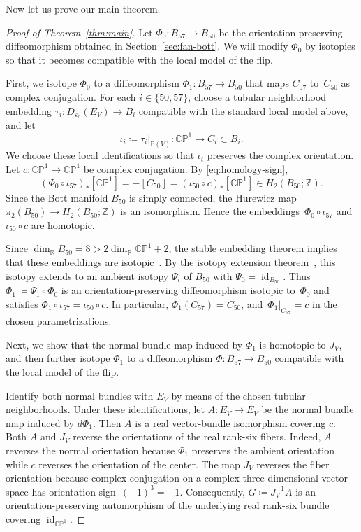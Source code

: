 \documentclass{amsart}
\numberwithin{equation}{section}
\theoremstyle{definition}
\newcommand{\Z}{\mathbb Z}
\newcommand{\R}{\mathbb R}
\renewcommand{\P}{\mathbb P}
\newcommand{\CP}{\mathbb{CP}}
\DeclareMathOperator{\id}{id}
\begin{document}
Now let us prove our main theorem.
\begin{proof}[Proof of Theorem~\ref{thm:main}]
    Let $\Phi_0\colon B_{57}\to B_{50}$ be the orientation-preserving diffeomorphism obtained in Section~\ref{sec:fan-bott}.
    We will modify $\Phi_0$ by isotopies so that it becomes compatible with the local model of the flip. 

    First, we isotope $\Phi_0$ to a diffeomorphism $\Phi_1\colon B_{57}\to B_{50}$ that maps $C_{57}$ to~$C_{50}$ as complex conjugation. 
    For each $i\in\{50,57\}$, choose a tubular neighborhood embedding $\tau_i\colon D_{\varepsilon_0}(E_V)\to B_i$ compatible with the standard local model above, and let
    $$
        \iota_i\coloneq \left.\tau_i\right|_{\P(V)} \colon \CP^1\longrightarrow C_i\subset B_i.
    $$
    We choose these local identifications so that $\iota_i$ preserves the complex orientation. 
    Let $c\colon\CP^1\to\CP^1$ be complex conjugation.
    By \eqref{eq:homology-sign},
    $$
        (\Phi_0\circ\iota_{57})_*[\CP^1] = -[C_{50}]= (\iota_{50}\circ c)_*[\CP^1] \in H_2(B_{50};\Z).
    $$
    Since the Bott manifold $B_{50}$ is simply connected, the Hurewicz map $\pi_2(B_{50})\to H_2(B_{50};\Z)$ is an isomorphism. 
    Hence the embeddings~$\Phi_0\circ\iota_{57}$ and $\iota_{50}\circ c$ are homotopic.
    
    Since $\dim_\R B_{50}=8>2\dim_\R \CP^1+2$, the stable embedding theorem implies that these embeddings are isotopic~\cite[Proposition~II]{Mazur1963}. 
    By the isotopy extension theorem~\cite[Proposition~III]{Mazur1963}, this isotopy extends to an ambient isotopy $\Psi_t$ of $B_{50}$ with $\Psi_0 = \id_{B_{50}}$.
    Thus $\Phi_1 \coloneq \Psi_1 \circ \Phi_0$ is an orientation-preserving diffeomorphism isotopic to~$\Phi_0$ and satisfies $\Phi_1\circ\iota_{57}=\iota_{50}\circ c$.
    In particular, $\Phi_1(C_{57})=C_{50}$, and~$\Phi_1|_{C_{57}}=c$ in the chosen parametrizations. 
    
    Next, we show that the normal bundle map induced by $\Phi_1$ is homotopic to $J_V$, and then further isotope $\Phi_1$ to a diffeomorphism $\Phi\colon B_{57}\to B_{50}$ compatible with the local model of the flip.
    
    Identify both normal bundles with $E_V$ by means of the chosen tubular neighborhoods. 
    Under these identifications, let $A\colon E_V\to E_V$ be the normal bundle map induced by $d\Phi_1$. 
    Then $A$ is a real vector-bundle isomorphism covering $c$.
    Both $A$ and $J_V$ reverse the orientations of the real rank-six fibers. 
    Indeed, $A$ reverses the normal orientation because $\Phi_1$ preserves the ambient orientation while $c$ reverses the orientation of the center. 
    The map $J_V$ reverses the fiber orientation because complex conjugation on a complex three-dimensional vector space has orientation sign~$(-1)^3=-1$. 
    Consequently, $G\coloneq J_V^{-1}A$ is an orientation-preserving automorphism of the underlying real rank-six bundle covering $\id_{\CP^1}$.
    

\end{proof}
\end{document}
